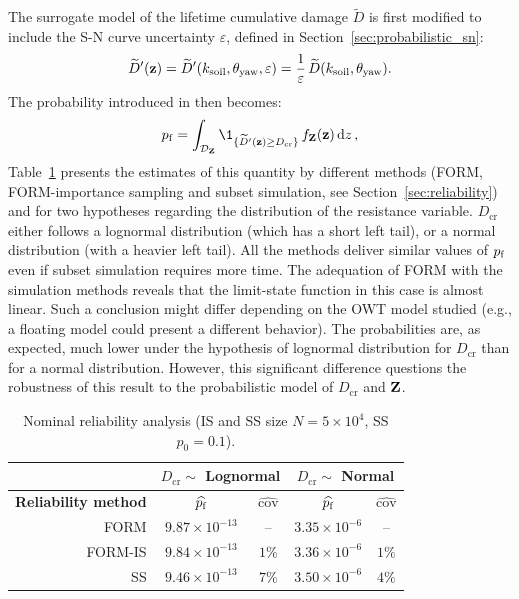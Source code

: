 The surrogate model of the lifetime cumulative damage $\widetilde{D}$ is first modified to include the S-N curve uncertainty $\varepsilon$, defined in Section~\ref{sec:probabilistic_sn}:
\begin{equation}
    \widetilde{D}'({\bf z}) = \widetilde{D}'(k_{\mathrm{soil}}, \theta_{\mathrm{yaw}}, \varepsilon) = \frac1\varepsilon \, \widetilde{D}(k_{\mathrm{soil}}, \theta_{\mathrm{yaw}}).
\end{equation} 
The probability introduced in  then becomes: 
\begin{equation}
    \pf = \int_{\iD_\bZ} \1_{\{\widetilde{D}'(\bz) \geq D_{\mathrm{cr}}\}} \, f_\bZ(\bz) \, \dd z \,,
    \label{eq:owt_pf_surrogate}
\end{equation}
Table~\ref{tab:pf_result_table} presents the estimates of this quantity by different methods (FORM, FORM-importance sampling and subset simulation, see Section~\ref{sec:reliability}) and for two hypotheses regarding the distribution of the resistance variable. 
$D_{\mathrm{cr}}$ either follows a lognormal distribution (which has a short left tail), or a normal distribution (with a heavier left tail). 
All the methods deliver similar values of $p_\mathrm{f}$ even if subset simulation requires more time. 
The adequation of FORM with the simulation methods reveals that the limit-state function in this case is almost linear. 
Such a conclusion might differ depending on the OWT model studied (e.g., a floating model could present a different behavior). 
The probabilities are, as expected, much lower under the hypothesis of lognormal distribution for $D_{\mathrm{cr}}$ than for a normal distribution. 
However, this significant difference questions the robustness of this result to the probabilistic model of $D_{\mathrm{cr}}$ and ${\bf Z}$.  

\begin{table}[h]
    \centering
    \caption{Nominal reliability analysis (IS and SS size $N=5 \times 10^4$, SS $p_0=0.1$).}
    \begin{tabular}{r||c|c|c|c}
              &  \multicolumn{2}{c|}{$D_{\mathrm{cr}} \sim $ \bf Lognormal} & \multicolumn{2}{c}{$D_{\mathrm{cr}} \sim $ \bf Normal}\\
    \hline
    \bf Reliability method & $\widehat{p_\mathrm{f}}$       & $\widehat{\mathrm{cov}}$    & $\widehat{p_\mathrm{f}}$       & $\widehat{\mathrm{cov}}$ \\
    \hline\hline
    FORM      & $9.87 \times 10^{-13}$ & --                    & $3.35 \times 10^{-6}$ & --\\
    \hline
    FORM-IS   & $9.84 \times 10^{-13}$ & $1 \%$                & $3.36 \times 10^{-6}$ & $1 \%$\\
    \hline
    SS        & $9.46 \times 10^{-13}$ & $7 \%$               & $3.50 \times 10^{-6}$ & $4 \%$\\ 
    \end{tabular}
    \label{tab:pf_result_table}
\end{table}


